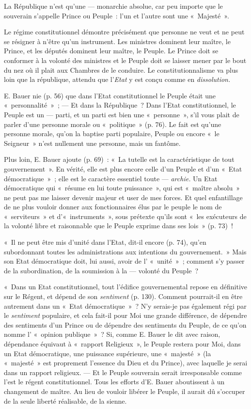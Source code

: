 \documentclass[french,twoside]{book} %
\begin{document}
La République n’est qu’une — monarchie absolue, car peu importe que le souverain s’appelle Prince ou Peuple : l’un et l’autre sont une « Majesté ».\par
Le régime constitutionnel démontre précisément que personne ne veut et ne peut se résigner à n’être qu’un instrument. Les ministres dominent leur maître, le Prince, et les députés dominent leur maître, le Peuple. Le Prince doit se conformer à la volonté des ministres et le Peuple doit se laisser mener par le bout du nez où il plait aux Chambres de le conduire. Le constitutionnalisme va plus loin que la république, attendu que l’\emph{Etat} y est conçu comme en \emph{dissolution.}\par
E. Bauer nie (p. 56) que dans l’Etat constitutionnel le Peuple était une « personnalité » ; — Et dans la République ? Dans l’Etat constitutionnel, le Peuple est un — parti, et un parti est bien une « personne », s’il vous plait de parler d’une personne morale ou « politique » (p. 76). Le fait est qu’une personne morale, qu’on la baptise parti populaire, Peuple ou encore « le Seigneur » n’est nullement une personne, mais un fantôme.\par
Plus loin, E. Bauer ajoute (p. 69) : « La tutelle est la caractéristique de tout gouvernement ». En vérité, elle est plus encore celle d’un Peuple et d’un « Etat démocratique » ; elle est le caractère essentiel toute — \emph{archie.} Un Etat démocratique qui « résume en lui toute puissance », qui est « maître absolu » ne peut pas me laisser devenir majeur et user de mes forces. Et quel enfantillage de ne plus vouloir donner aux fonctionnaires élus par le peuple le nom de « serviteurs » et d’« instruments », sous prétexte qu’ils sont « les exécuteurs de la volonté libre et raisonnable que le Peuple exprime dans ses lois » (p. 73) !\par
« Il ne peut être mis d’unité dans l’Etat, dit-il encore (p. 74), qu’en subordonnant toutes les administrations  aux intentions du gouvernement. » Mais son Etat démocratique doit, lui aussi, avoir de l’ « unité » ; comment s’y passer de la subordination, de la soumission à la — volonté du Peuple ?\par
« Dans un Etat constitutionnel, tout l’édifice gouvernemental repose en définitive sur le Régent, et dépend de son \emph{sentiment} (p. 130). Comment pourrait-il en être autrement dans un « Etat démocratique » ? N’y serais-je pas également régi par le \emph{sentiment} populaire, et cela fait-il pour Moi une grande différence, de dépendre des sentiments d’un Prince ou de dépendre des sentiments du Peuple, de ce qu’on nomme l’ « opinion publique » ? Si, comme E. Bauer le dit avec raison, dépendance équivaut à « rapport Religieux », le Peuple restera pour Moi, dans un Etat démocratique, une puissance supérieure, une « majesté » (la « majesté » est proprement l’essence du Dieu et du Prince), avec laquelle je serai dans un rapport religieux. — Et le Peuple souverain serait irresponsable comme l’est le régent constitutionnel. Tous les efforts d’E. Bauer aboutissent à un changement de maître. Au lieu de vouloir libérer le Peuple, il aurait dû s’occuper de la seule liberté réalisable, de la sienne.\par
\end{document}
